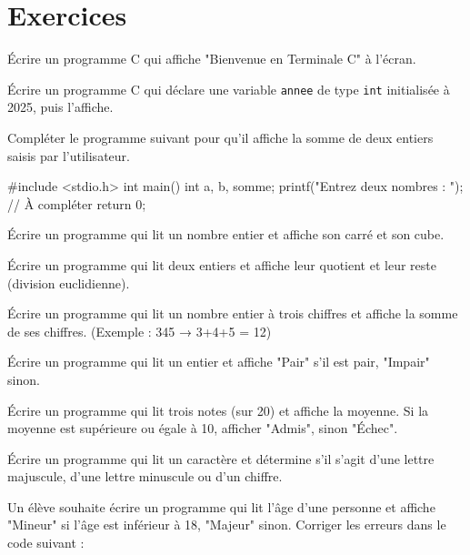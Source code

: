 \section{Exercices}


\exo{}
Écrire un programme C qui affiche "Bienvenue en Terminale C" à l'écran.

\exo{}
Écrire un programme C qui déclare une variable \texttt{annee} de type \texttt{int} initialisée à 2025, puis l'affiche.

\exo{}
Compléter le programme suivant pour qu'il affiche la somme de deux entiers saisis par l'utilisateur.

\begin{ccode}
#include <stdio.h>
int main() {
    int a, b, somme;
    printf("Entrez deux nombres : ");
    // À compléter
    return 0;
}
\end{ccode}


\exo{}
Écrire un programme qui lit un nombre entier et affiche son carré et son cube.

\exo{}
Écrire un programme qui lit deux entiers et affiche leur quotient et leur reste (division euclidienne).

\exo{}
Écrire un programme qui lit un nombre entier à trois chiffres et affiche la somme de ses chiffres. (Exemple : 345 → 3+4+5 = 12)


\exo{}
Écrire un programme qui lit un entier et affiche "Pair" s'il est pair, "Impair" sinon.

\exo{}
Écrire un programme qui lit trois notes (sur 20) et affiche la moyenne. Si la moyenne est supérieure ou égale à 10, afficher "Admis", sinon "Échec".

\exo{}
Écrire un programme qui lit un caractère et détermine s'il s'agit d'une lettre majuscule, d'une lettre minuscule ou d'un chiffre.

\exo{}\sujetbac[2023, C]{}
Un élève souhaite écrire un programme qui lit l'âge d'une personne et affiche "Mineur" si l'âge est inférieur à 18, "Majeur" sinon. Corriger les erreurs dans le code suivant :

\begin{ccode}
#include <stdio.h>
int main() {
    int age;
    printf("Entrez votre age : ");
    scanf("%
    if (age < 18) {
        printf("Mineur\n");
    else {
        printf("Majeur\n");
    }
    return 0;
}
\end{ccode}

